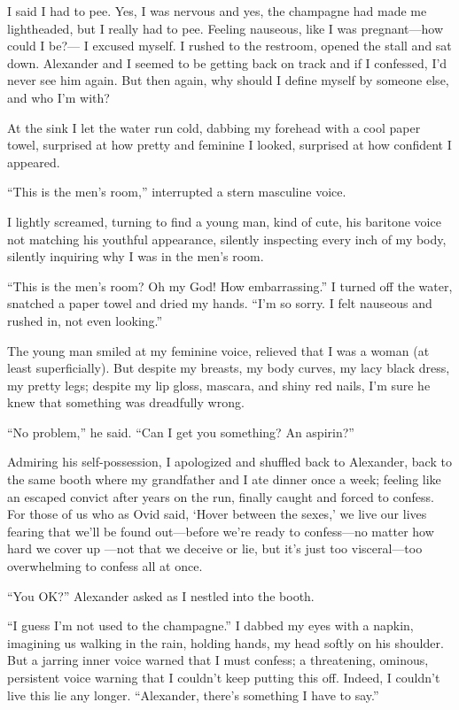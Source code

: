 I said I had to pee. Yes, I was nervous and yes, the champagne had made
me lightheaded, but I really had to pee. Feeling nauseous, like I was
pregnant---how could I be?--- I excused myself. I rushed to the
restroom, opened the stall and sat down. Alexander and I seemed to be
getting back on track and if I confessed, I'd never see him again. But
then again, why should I define myself by someone else, and who I'm
with?

At the sink I let the water run cold, dabbing my forehead with a cool
paper towel, surprised at how pretty and feminine I looked, surprised at
how confident I appeared.

``This is the men's room,'' interrupted a stern masculine voice.

I lightly screamed, turning to find a young man, kind of cute, his
baritone voice not matching his youthful appearance, silently inspecting
every inch of my body, silently inquiring why I was in the men's room.

``This is the men's room? Oh my God! How embarrassing.'' I turned off
the water, snatched a paper towel and dried my hands. ``I'm so sorry. I
felt nauseous and rushed in, not even looking.''

The young man smiled at my feminine voice, relieved that I was a woman
(at least superficially). But despite my breasts, my body curves, my
lacy black dress, my pretty legs; despite my lip gloss, mascara, and
shiny red nails, I'm sure he knew that something was dreadfully wrong.

``No problem,'' he said. ``Can I get you something? An aspirin?'' ~

Admiring his self-possession, I apologized and shuffled back to
Alexander, back to the same booth where my grandfather and I ate dinner
once a week; feeling like an escaped convict after years on the run,
finally caught and forced to confess. For those of us who as Ovid said,
`Hover between the sexes,' we live our lives fearing that we'll be found
out---before we're ready to confess---no matter how hard we cover up
---not that we deceive or lie, but it's just too visceral---too
overwhelming to confess all at once.

``You OK?'' Alexander asked as I nestled into the booth.

``I guess I'm not used to the champagne.'' I dabbed my eyes with a
napkin, imagining us walking in the rain, holding hands, my head softly
on his shoulder. But a jarring inner voice warned that I must confess; a
threatening, ominous, persistent voice warning that I couldn't keep
putting this off. Indeed, I couldn't live this lie any longer.
``Alexander, there's something I have to say.''

